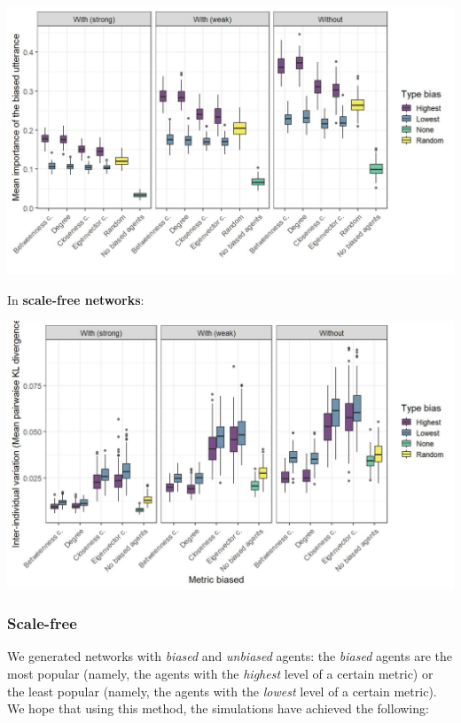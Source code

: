 \documentclass[
]{article}
\begin{document}
\begin{center}\includegraphics{./Figures/unnamed-chunk-195-1} \end{center}

In \textbf{scale-free networks}:

\begin{center}\includegraphics{./Figures/unnamed-chunk-196-1} \end{center}

\hypertarget{scale-free}{%
\subsubsection{Scale-free}\label{scale-free}}

We generated networks with \emph{biased} and \emph{unbiased} agents: the
\emph{biased} agents are the most popular (namely, the agents with the
\emph{highest} level of a certain metric) or the least popular (namely,
the agents with the \emph{lowest} level of a certain metric). We hope
that using this method, the simulations have achieved the following:
\end{document}
